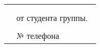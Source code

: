 








\thispagestyle{empty}%

\noindent
\begin{minipage}{\linewidth}
	\vspace{\mfloatsep} %
	\begin{tabularx}{\linewidth}{Xl}
		&\HeadApTitle     \\ 			
		&\HeadAp       \\
		& от студента группы.~\group \\
		& \AuthorFull \\
		& № телефона \AuthorPhone \\ 
	\end{tabularx}
	\vspace{\mfloatsep} %
\end{minipage}


